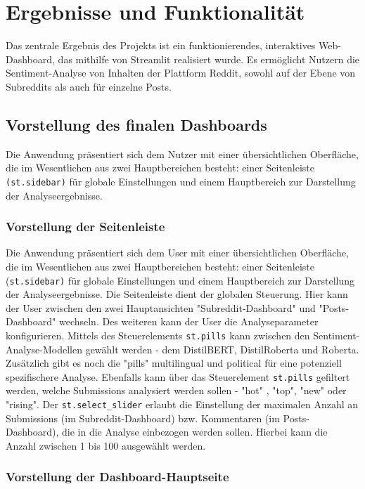 \section{Ergebnisse und Funktionalität}

Das zentrale Ergebnis des Projekts ist ein funktionierendes, interaktives Web-Dashboard, das mithilfe von Streamlit realisiert wurde. Es ermöglicht Nutzern die Sentiment-Analyse von Inhalten der Plattform Reddit, sowohl auf der Ebene von Subreddits als auch für einzelne Posts.

\subsection{Vorstellung des finalen Dashboards}

Die Anwendung präsentiert sich dem Nutzer mit einer übersichtlichen Oberfläche, die im Wesentlichen aus zwei Hauptbereichen besteht: einer Seitenleiste \verb|(st.sidebar)| für globale Einstellungen und einem Hauptbereich zur Darstellung der Analyseergebnisse.

\subsubsection{Vorstellung der Seitenleiste}

Die Anwendung präsentiert sich dem User mit einer übersichtlichen Oberfläche, die im Wesentlichen aus zwei Hauptbereichen besteht: einer Seitenleiste (\verb|st.sidebar)| für globale Einstellungen und einem Hauptbereich zur Darstellung der Analyseergebnisse.
Die Seitenleiste dient der globalen Steuerung. Hier kann der User zwischen den zwei Hauptansichten "Subreddit-Dashboard" und "Posts-Dashboard" wechseln. Des weiteren kann der User die Analyseparameter konfigurieren. Mittels des Steuerelements \verb|st.pills| kann zwischen den Sentiment-Analyse-Modellen gewählt werden - dem DistilBERT, DistilRoberta und Roberta. Zusätzlich gibt es noch die "pills" multilingual und political für eine potenziell spezifischere Analyse.
Ebenfalls kann über das Steuerelement \verb|st.pills| gefiltert werden, welche Submissions analysiert werden sollen - "hot" , "top", "new" oder "rising". Der \verb|st.select_slider| erlaubt die Einstellung der maximalen Anzahl an Submissions (im Subreddit-Dashboard) bzw. Kommentaren (im Posts-Dashboard), die in die Analyse einbezogen werden sollen. Hierbei kann die Anzahl zwischen 1 bis 100 ausgewählt werden.

\subsubsection{Vorstellung der Dashboard-Hauptseite}


